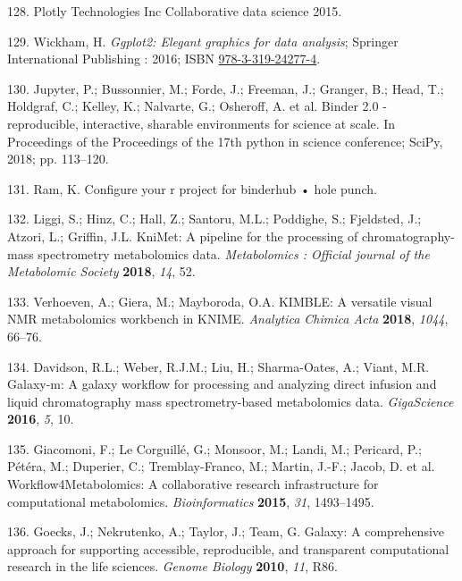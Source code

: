 \documentclass[]{article}
\begin{document}
\leavevmode\hypertarget{ref-plotlytechnologiesinc_website_2015}{}%
128. Plotly Technologies Inc Collaborative data science 2015.

\leavevmode\hypertarget{ref-wickham_2016}{}%
129. Wickham, H. \emph{Ggplot2: Elegant graphics for data analysis}; Springer International Publishing : 2016; ISBN \href{https://worldcat.org/isbn/978-3-319-24277-4}{978-3-319-24277-4}.

\leavevmode\hypertarget{ref-jupyter_2018}{}%
130. Jupyter, P.; Bussonnier, M.; Forde, J.; Freeman, J.; Granger, B.; Head, T.; Holdgraf, C.; Kelley, K.; Nalvarte, G.; Osheroff, A. et al. Binder 2.0 - reproducible, interactive, sharable environments for science at scale. In Proceedings of the Proceedings of the 17th python in science conference; SciPy, 2018; pp. 113--120.

\leavevmode\hypertarget{ref-ram_website_nd}{}%
131. Ram, K. Configure your r project for binderhub • hole punch.

\leavevmode\hypertarget{ref-liggi_2018}{}%
132. Liggi, S.; Hinz, C.; Hall, Z.; Santoru, M.L.; Poddighe, S.; Fjeldsted, J.; Atzori, L.; Griffin, J.L. KniMet: A pipeline for the processing of chromatography-mass spectrometry metabolomics data. \emph{Metabolomics : Official journal of the Metabolomic Society} \textbf{2018}, \emph{14}, 52.

\leavevmode\hypertarget{ref-verhoeven_2018}{}%
133. Verhoeven, A.; Giera, M.; Mayboroda, O.A. KIMBLE: A versatile visual NMR metabolomics workbench in KNIME. \emph{Analytica Chimica Acta} \textbf{2018}, \emph{1044}, 66--76.

\leavevmode\hypertarget{ref-davidson_2016}{}%
134. Davidson, R.L.; Weber, R.J.M.; Liu, H.; Sharma-Oates, A.; Viant, M.R. Galaxy-m: A galaxy workflow for processing and analyzing direct infusion and liquid chromatography mass spectrometry-based metabolomics data. \emph{GigaScience} \textbf{2016}, \emph{5}, 10.

\leavevmode\hypertarget{ref-giacomoni_2015}{}%
135. Giacomoni, F.; Le Corguillé, G.; Monsoor, M.; Landi, M.; Pericard, P.; Pétéra, M.; Duperier, C.; Tremblay-Franco, M.; Martin, J.-F.; Jacob, D. et al. Workflow4Metabolomics: A collaborative research infrastructure for computational metabolomics. \emph{Bioinformatics} \textbf{2015}, \emph{31}, 1493--1495.

\leavevmode\hypertarget{ref-goecks_2010}{}%
136. Goecks, J.; Nekrutenko, A.; Taylor, J.; Team, G. Galaxy: A comprehensive approach for supporting accessible, reproducible, and transparent computational research in the life sciences. \emph{Genome Biology} \textbf{2010}, \emph{11}, R86.
\end{document}
